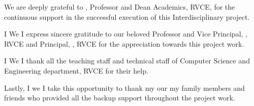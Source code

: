 \ifIDP
We are deeply grateful to \textbf{\printDA}, Professor and Dean Academics, RVCE, for the continuous support in the successful execution of this Interdisciplinary project.
\\ \par
\fi
\ifPG I \else \ifStuNameBUsed We \else I \fi\fi express sincere gratitude to our beloved Professor and Vice Principal, \textbf{\printVicePrincipal}, RVCE and Principal, \textbf{\printPrincipal}, RVCE for the appreciation towards this project work.\\ \par

\ifIDP \else\ifPG I \else\ifStuNameBUsed We \else I \fi\fi thank all the teaching staff and technical staff of Computer Science and Engineering department, RVCE for their help.\\ \par \fi

Lastly, \ifPG I \else\ifStuNameBUsed we \else I \fi\fi take this opportunity to thank \ifPG my \else\ifStuNameBUsed our \else my \fi\fi family members and friends who provided all the backup support throughout the project work.\\ \par